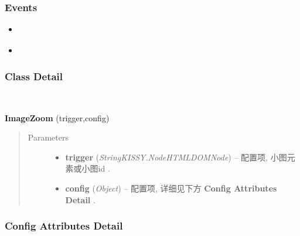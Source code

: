 \documentclass[letterpaper,10pt,english]{sphinxmanual}
\begin{document}
\subsubsection{Events}
\label{api/component/imagezoom/index:events}\begin{itemize}
\item {}
{\hyperref[api/component/imagezoom/index:ImageZoom.show]{}}

\item {}
{\hyperref[api/component/imagezoom/index:ImageZoom.hide]{}}

\end{itemize}


\subsubsection{Class Detail}
\label{api/component/imagezoom/index:class-detail}

\begin{fulllineitems}
\label{api/component/imagezoom/index:ImageZoom.ImageZoom}~
\begin{DUlineblock}{0em}
\item[] \textbf{ImageZoom} (trigger,config)
\end{DUlineblock}
\begin{quote}\begin{description}
\item[{Parameters}] \leavevmode\begin{itemize}
\item {}
\textbf{trigger} (\emph{String\textbar{}KISSY.Node\textbar{}HTMLDOMNode}) -- 配置项, 小图元素或小图id .

\item {}
\textbf{config} (\emph{Object}) -- 配置项, 详细见下方 \textbf{Config Attributes Detail} .

\end{itemize}

\end{description}\end{quote}

\end{fulllineitems}



\subsubsection{Config Attributes Detail}
\label{api/component/imagezoom/index:config-attributes-detail}
\end{document}
